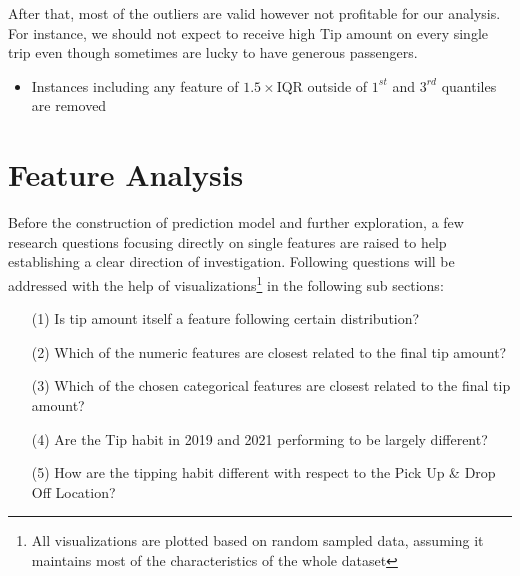 \documentclass[11pt]{article}
\begin{document}
After that, most of the outliers are valid however not profitable for our analysis. For instance, we should not expect to receive high Tip amount on every single trip even though sometimes are lucky to have generous passengers.
\begin{itemize}
    \item Instances including any feature of $1.5 \times $IQR outside of $1^{st}$ and $3^{rd}$ quantiles are removed
\end{itemize}




\section{Feature Analysis}
Before the construction of prediction model and further exploration, a few research questions focusing directly on single features are raised to help establishing a clear direction of investigation. Following questions will be addressed with the help of visualizations\footnote{All visualizations are plotted based on random sampled data, assuming it maintains most of the characteristics of the whole dataset} in the following sub sections:
\begin{enumerate}
    \item[(1)] Is tip amount itself a feature following certain distribution? 
    \item[(2)] Which of the numeric features are closest related to the final tip amount?
    \item[(3)] Which of the chosen categorical features are closest related to the final tip amount?
    \item[(4)] Are the Tip habit in 2019 and 2021 performing to be largely different?
    \item[(5)] How are the tipping habit different with respect to the Pick Up \& Drop Off Location?
\end{enumerate}
\end{document}

